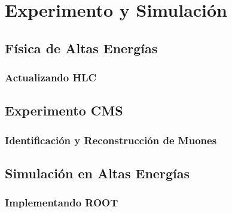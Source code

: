 \documentclass[12pt]{report}
\begin{document}
		
				


\chapter{Experimento y Simulación}

		
	\section{Física de Altas Energías}
	
		
		\subsection{Actualizando HLC}	
		
	
	\section{Experimento CMS}
	
	
	
		\subsection{Identificación y Reconstrucción de Muones}
		
		
	\section{Simulación en Altas Energías}
	
	
		\subsection{Implementando ROOT}\label{C_root}
		
		
		
\end{document}
